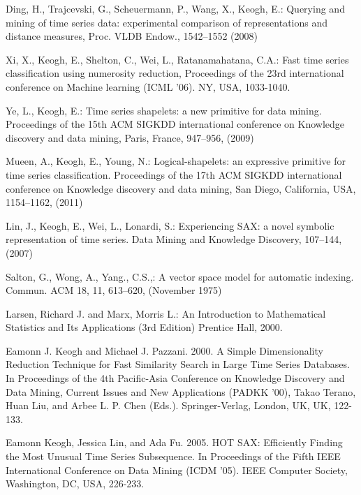 \documentclass{llncs}
\begin{document}
%
%
\begin{thebibliography}{5}
%

Ding, H., Trajcevski, G., Scheuermann, P., Wang, X., Keogh, E.:
Querying and mining of time series data: experimental comparison of representations and distance measures,
Proc. VLDB Endow., 1542--1552 (2008)

Xi, X., Keogh, E., Shelton, C., Wei, L., Ratanamahatana, C.A.:
Fast time series classification using numerosity reduction,
Proceedings of the 23rd international conference on Machine learning (ICML '06). 
NY, USA, 1033-1040.

Ye, L., Keogh, E.:
Time series shapelets: a new primitive for data mining.
Proceedings of the 15th ACM SIGKDD international conference on Knowledge discovery and data mining,
Paris, France, 947--956, (2009)

Mueen, A., Keogh, E., Young, N.:
Logical-shapelets: an expressive primitive for time series classification.
Proceedings of the 17th ACM SIGKDD international conference on Knowledge discovery and data mining,
San Diego, California, USA, 1154--1162, (2011)

Lin, J., Keogh, E., Wei, L., Lonardi, S.:
Experiencing SAX: a novel symbolic representation of time series.
Data Mining and Knowledge Discovery, 107--144, (2007)

Salton, G., Wong, A., Yang., C.S.,:
A vector space model for automatic indexing. 
Commun. ACM 18, 11, 613--620, (November 1975)

Larsen, Richard J. and Marx, Morris L.:
An Introduction to Mathematical Statistics and Its Applications (3rd Edition)
Prentice Hall, 2000.

Eamonn J. Keogh and Michael J. Pazzani. 2000. A Simple Dimensionality Reduction Technique for Fast
Similarity Search in Large Time Series Databases. In Proceedings of the 4th Pacific-Asia Conference
on Knowledge Discovery and Data Mining, Current Issues and New Applications (PADKK '00), Takao
Terano, Huan Liu, and Arbee L. P. Chen (Eds.). Springer-Verlag, London, UK, UK, 122-133.

Eamonn Keogh, Jessica Lin, and Ada Fu. 2005. HOT SAX: Efficiently Finding the Most Unusual Time
Series Subsequence. In Proceedings of the Fifth IEEE International Conference on Data Mining (ICDM
'05). IEEE Computer Society, Washington, DC, USA, 226-233.


\end{thebibliography}
\end{document}
